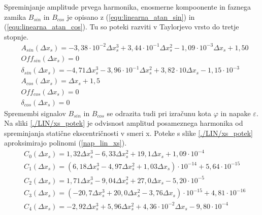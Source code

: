 Spreminjanje amplitude prvega harmonika, enosmerne kompoonente in faznega zamika $B_{sin}$ in $B_{cos}$ je opisano z (\ref{equ:linearna_atan_sin}) in (\ref{equ:linearna_atan_cos}). Tu so poteki razviti v Taylorjevo vrsto do tretje stopnje.
\begin{eqnarray}
\label{analog_lin_xs}
&A_{sin}(\Delta x_s) = -3,38\cdot 10^{-2}\Delta x_s^3+3,44\cdot 10^{-1}\Delta x_s^2-1,09\cdot 10^{-3}\Delta x_s+1,50 \\
&Off_{sin}(\Delta x_s) = 0 \\
&\delta_{sin}(\Delta x_s) = -4,71 \Delta x_s^3-3,96\cdot 10^{-1}\Delta x_s^2+3,82\cdot 10  \Delta x_s-1,15\cdot 10^{-3}  \\   
&A_{cos}(\Delta x_s) = \Delta x_s+1,5\\
&Off_{cos}(\Delta x_s) = 0 \\
&\delta_{cos}(\Delta x_s) = 0
\end{eqnarray}
\newpage
Spremembi signalov $B_{sin}$ in $B_{cos}$ se odrazita tudi pri izračunu kota $\varphi$ in napake $\varepsilon$.
Na sliki \ref{./LIN/xs_potek} je odvisnost amplitud posameznega harmonika od spreminjanja statične ekscentričnosti v smeri x. Poteke s slike \ref{./LIN/xs_potek} aproksimirajo polinomi (\ref{nap_lin_xs}).
\begin{eqnarray}
\label{nap_lin_xs}
&C_0(\Delta x_s) =1,32\Delta x_s^{3}-6,33\Delta x_s^{2}+19,1\Delta x_s+1,09\cdot 10^{-4} \\                                    
&C_1(\Delta x_s) =(6,18\Delta x_s^{3}-4,97\Delta x_s^{2}+1,03\Delta x_s)\cdot 10^{-14}+5,64\cdot 10^{-15} \\ 
&C_2 (\Delta x_s)=1,71\Delta x_s^{3}-9,04\Delta x_s^{2}+27,0\Delta x_s-5,20\cdot 10^{-5} \\                                    
&C_3(\Delta x_s) =(-20,7\Delta x_s^{3}+20,0\Delta x_s^{2}-3,76\Delta x_s)\cdot 10^{-15}+4,81\cdot 10^{-16} \\
&C_4 (\Delta x_s)=-2,92\Delta x_s^{3}+5,96\Delta x_s^{2}+4,36\cdot 10^{-2}\Delta x_s-9,80\cdot 10^{-4} 
\end{eqnarray}

